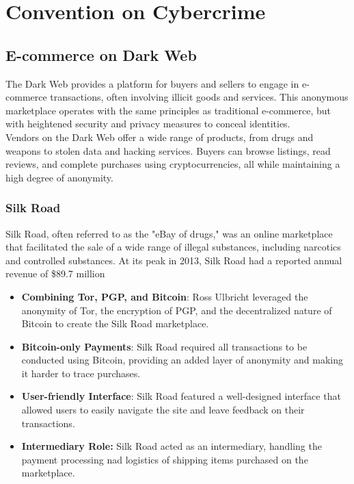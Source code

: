 \chapter{Convention on Cybercrime}

\section{E-commerce on Dark Web}
The Dark Web provides a platform for buyers and sellers to engage in e-commerce transactions, often involving illicit goods and services. This anonymous marketplace operates with the same principles as traditional e-commerce, but with heightened security and privacy measures to conceal identities. \\ Vendors on the Dark Web offer a wide range of products, from drugs and weapons to stolen data and hacking services. Buyers can browse listings, read reviews, and complete purchases using cryptocurrencies, all while maintaining a high degree of anonymity.

\subsection{Silk Road}
Silk Road, often referred to as the "eBay of drugs," was an online marketplace that facilitated the sale of a wide range of illegal substances, including narcotics and controlled substances. At its peak in 2013, Silk Road had a reported annual revenue of \$89.7 million

\begin{itemize}[itemsep=0pt]
  \item \textbf{Combining Tor, PGP, and Bitcoin}: Ross Ulbricht leveraged the anonymity of Tor, the encryption of PGP, and the decentralized nature of Bitcoin to create the Silk Road marketplace.
  \item \textbf{Bitcoin-only Payments}: Silk Road required all transactions to be conducted using Bitcoin, providing an added layer of anonymity and making it harder to trace purchases.
  \item \textbf{User-friendly Interface}: Silk Road featured a well-designed interface that allowed users to easily navigate the site and leave feedback on their transactions.
  \item \textbf{Intermediary Role:} Silk Road acted as an intermediary, handling the payment processing nad logistics of shipping items purchased on the marketplace.
\end{itemize}

